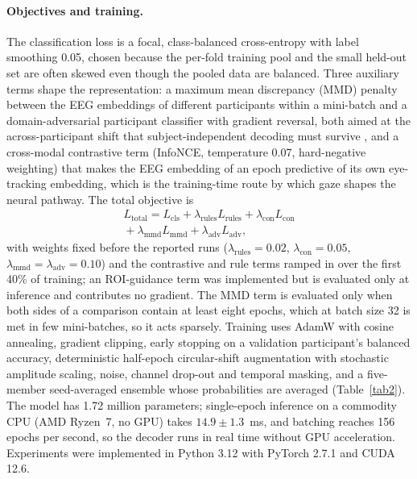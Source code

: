 \documentclass[pdflatex,sn-basic,Numbered,twocolumn,iicol]{sn-jnl}
\theoremstyle{thmstyleone}%
\theoremstyle{thmstyletwo}%
\theoremstyle{thmstylethree}%
\begin{document}
\paragraph{Objectives and training.} The classification loss is a focal, class-balanced cross-entropy \cite{ref48,ref49} with label smoothing 0.05, chosen because the per-fold training pool and the small held-out set are often skewed even though the pooled data are balanced. Three auxiliary terms shape the representation: a maximum mean discrepancy (MMD) penalty between the EEG embeddings of different participants within a mini-batch and a domain-adversarial participant classifier with gradient reversal, both aimed at the across-participant shift that subject-independent decoding must survive \cite{ref31,ref32}, and a cross-modal contrastive term (InfoNCE, temperature 0.07, hard-negative weighting) that makes the EEG embedding of an epoch predictive of its own eye-tracking embedding, which is the training-time route by which gaze shapes the neural pathway. The total objective is
\begin{multline}
L_{\mathrm{total}} = L_{\mathrm{cls}} + \lambda_{\mathrm{rules}} L_{\mathrm{rules}} + \lambda_{\mathrm{con}} L_{\mathrm{con}} \\
{} + \lambda_{\mathrm{mmd}} L_{\mathrm{mmd}} + \lambda_{\mathrm{adv}} L_{\mathrm{adv}}, \label{eq26}
\end{multline}
with weights fixed before the reported runs ($\lambda_{\mathrm{rules}}=0.02$, $\lambda_{\mathrm{con}}=0.05$, $\lambda_{\mathrm{mmd}}=\lambda_{\mathrm{adv}}=0.10$) and the contrastive and rule terms ramped in over the first 40\% of training; an ROI-guidance term was implemented but is evaluated only at inference and contributes no gradient. The MMD term is evaluated only when both sides of a comparison contain at least eight epochs, which at batch size 32 is met in few mini-batches, so it acts sparsely. Training uses AdamW with cosine annealing, gradient clipping, early stopping on a validation participant's balanced accuracy, deterministic half-epoch circular-shift augmentation with stochastic amplitude scaling, noise, channel drop-out and temporal masking, and a five-member seed-averaged ensemble whose probabilities are averaged (Table~\ref{tab2}). The model has 1.72 million parameters; single-epoch inference on a commodity CPU (AMD Ryzen~7, no GPU) takes $14.9\pm1.3$~ms, and batching reaches 156 epochs per second, so the decoder runs in real time without GPU acceleration. Experiments were implemented in Python 3.12 with PyTorch 2.7.1 and CUDA 12.6.
\end{document}
